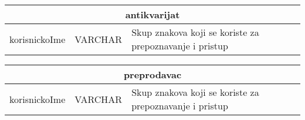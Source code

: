 \documentclass{article}
\begin{document}
	\begin{tabular}{ |p{4cm}|p{3cm}|p{5cm}|  }
		\hline
		\multicolumn{3}{|c|}{\textbf{antikvarijat}} \\
		\bottomrule[2pt]
		\cellcolor{blue!10}korisnickoIme & VARCHAR & Skup znakova koji se koriste za prepoznavanje i pristup\\
		\hline
	\end{tabular}
	\vspace{1cm}
	\begin{tabular}{ |p{4cm}|p{3cm}|p{5cm}|  }
		\hline
		\multicolumn{3}{|c|}{\textbf{preprodavac}} \\
		\bottomrule[2pt]
		\cellcolor{blue!10}korisnickoIme & VARCHAR & Skup znakova koji se koriste za prepoznavanje i pristup\\
		\hline
	\end{tabular}
	
	
	
	
\end{document}
